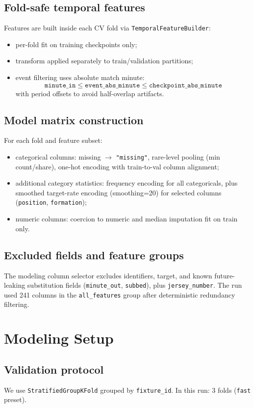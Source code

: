 \documentclass[11pt, a4paper]{article}
\begin{document}
\subsection{Fold-safe temporal features}
Features are built inside each CV fold via \texttt{TemporalFeatureBuilder}:
\begin{itemize}
    \item per-fold fit on training checkpoints only;
    \item transform applied separately to train/validation partitions;
    \item event filtering uses absolute match minute:
    \[
    \texttt{minute\_in} \leq \texttt{event\_abs\_minute} \leq \texttt{checkpoint\_abs\_minute}
    \]
    with period offsets to avoid half-overlap artifacts.
\end{itemize}

\subsection{Model matrix construction}
For each fold and feature subset:
\begin{itemize}
    \item categorical columns: missing $\rightarrow$ \texttt{"missing"}, rare-level pooling (min count/share), one-hot encoding with train-to-val column alignment;
    \item additional category statistics: frequency encoding for all categoricals, plus smoothed target-rate encoding (smoothing=20) for selected columns (\texttt{position}, \texttt{formation});
    \item numeric columns: coercion to numeric and median imputation fit on train only.
\end{itemize}

\subsection{Excluded fields and feature groups}
The modeling column selector excludes identifiers, target, and known future-leaking substitution fields (\texttt{minute\_out}, \texttt{subbed}), plus \texttt{jersey\_number}. The run used 241 columns in the \texttt{all\_features} group after deterministic redundancy filtering.

\section{Modeling Setup}

\subsection{Validation protocol}
We use \texttt{StratifiedGroupKFold} grouped by \texttt{fixture\_id}. In this run: 3 folds (\texttt{fast} preset).
\end{document}
